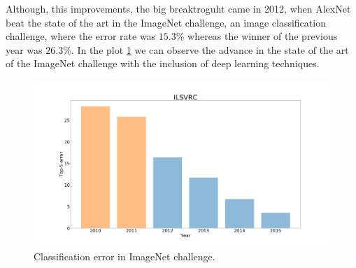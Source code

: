 \documentclass[12pt, a4paper, titlepage,twoside,openright]{article}
\begin{document}



%
%
%



Although, this improvements, the big breaktroguht came in 2012, when AlexNet \cite{alexnet} beat the state of the art in the ImageNet challenge, an image classification challenge, where the error rate was $15.3 \%$ whereas the winner of the previous year was $26.3 \%$. In the plot \ref{intro2} we can observe the advance in the state of the art of the ImageNet challenge with the inclusion of deep learning techniques.




\begin{figure}[H]
\centering         
\includegraphics[width=0.7\linewidth]{intro/figure_1.png}
\caption{Classification error in ImageNet challenge.} \label{intro2}
\end{figure}
\end{document}
